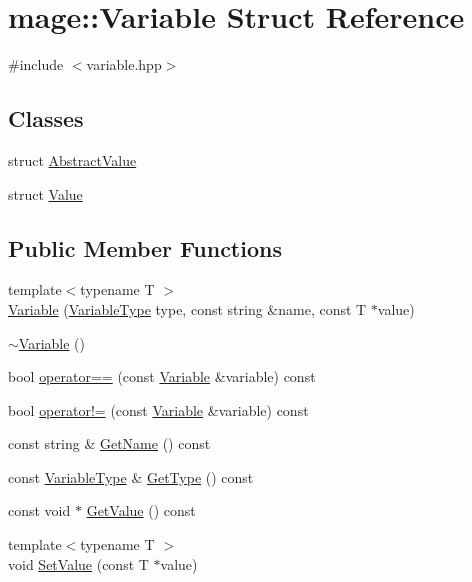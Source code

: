 \hypertarget{structmage_1_1_variable}{}\section{mage\+:\+:Variable Struct Reference}
\label{structmage_1_1_variable}


{\ttfamily \#include $<$variable.\+hpp$>$}

\subsection*{Classes}
\begin{DoxyCompactItemize}
\item 
struct \hyperlink{structmage_1_1_variable_1_1_abstract_value}{Abstract\+Value}
\item 
struct \hyperlink{structmage_1_1_variable_1_1_value}{Value}
\end{DoxyCompactItemize}
\subsection*{Public Member Functions}
\begin{DoxyCompactItemize}
\item 
{\footnotesize template$<$typename T $>$ }\\\hyperlink{structmage_1_1_variable_aefdee0e7bab3f1a18f0dc1cdc28429b6}{Variable} (\hyperlink{namespacemage_a530428e73bac0ba7fe84b29086a9e33a}{Variable\+Type} type, const string \&name, const T $\ast$value)
\item 
\hyperlink{structmage_1_1_variable_a8f4d3e950b25b14e996ad074e42a5e9e}{$\sim$\+Variable} ()
\item 
bool \hyperlink{structmage_1_1_variable_a5d1f7965ca7d0e29f6879cda014e8fa9}{operator==} (const \hyperlink{structmage_1_1_variable}{Variable} \&variable) const
\item 
bool \hyperlink{structmage_1_1_variable_a7983cd74a25e3998abac8d89245d1fd9}{operator!=} (const \hyperlink{structmage_1_1_variable}{Variable} \&variable) const
\item 
const string \& \hyperlink{structmage_1_1_variable_a7f70fdadf34cdf6b26adc9910eade11d}{Get\+Name} () const
\item 
const \hyperlink{namespacemage_a530428e73bac0ba7fe84b29086a9e33a}{Variable\+Type} \& \hyperlink{structmage_1_1_variable_a5265e80b2a1c280fad5886174dfc997a}{Get\+Type} () const
\item 
const void $\ast$ \hyperlink{structmage_1_1_variable_a65ecc95bcdc26733394d3a32d3d698f1}{Get\+Value} () const
\item 
{\footnotesize template$<$typename T $>$ }\\void \hyperlink{structmage_1_1_variable_afa9cfd0a42d8a15cccf7f49197648504}{Set\+Value} (const T $\ast$value)
\end{DoxyCompactItemize}
